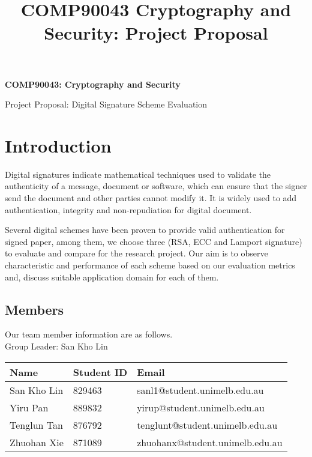 \documentclass[11pt]{article} %
\title{COMP90043 Cryptography and Security: Project Proposal}
\date{}
\begin{document}

\begin{center}
    \vspace*{1cm}
    
    \LARGE
    \textbf{COMP90043: Cryptography and Security}
    
    \vspace{0.3cm}
    \LARGE
    Project Proposal: Digital Signature Scheme Evaluation
\end{center}


\section{Introduction}

Digital signatures indicate mathematical techniques used to validate the authenticity of a message, document or software, which can ensure that the signer send the document and other parties cannot modify it. It is widely used to add authentication, integrity and non-repudiation for digital document.

Several digital schemes have been proven to provide valid authentication for signed paper, among them, we choose three (RSA, ECC and Lamport signature) to evaluate and compare for the research project. Our aim is to observe characteristic and performance of each scheme based on our evaluation metrics and, discuss suitable application domain for each of them. 

\subsection{Members}

Our team member information are as follows.
\\
Group Leader: San Kho Lin

\vspace{0.2cm}

\begin{tabular}{ |p{3cm}|p{3cm}|p{6cm}|  }
\hline
\textbf{Name} & \textbf{Student ID} & \textbf{Email} \\
\hline
San Kho Lin & 829463 & sanl1@student.unimelb.edu.au \\
\hline
Yiru Pan & 889832 & yirup@student.unimelb.edu.au \\
\hline
Tenglun Tan & 876792 & tenglunt@student.unimelb.edu.au \\
\hline
Zhuohan Xie & 871089 & zhuohanx@student.unimelb.edu.au \\
\hline
\end{tabular}
\end{document}
